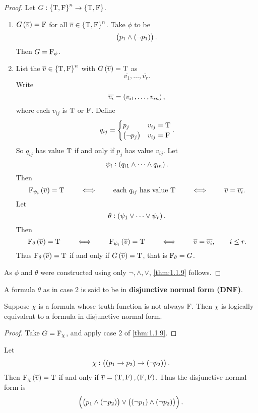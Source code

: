 \begin{proof}
Let $ G : \cbr{\T, \F}^n \to \cbr{\T, \F} $.
\begin{enumerate}[leftmargin=0.5in, label=Case \arabic*.]
\item $ G\br{\overline{v}} = \F $ for all $ \overline{v} \in \cbr{\T, \F}^n $. Take $ \phi $ to be
$$ \andb{p_1}{\notb{p_1}}. $$
Then $ G = \mathrm{F}_\phi $.

\pagebreak

\item List the $ \overline{v} \in \cbr{\T, \F}^n $ with $ G\br{\overline{v}} = \T $ as
$$ \overline{v_1}, \dots, \overline{v_r}. $$
Write
$$ \overline{v_i} = \br{v_{i1}, \dots, v_{in}}, $$
where each $ v_{ij} $ is $ \mathrm{T} $ or $ \mathrm{F} $. Define
$$ q_{ij} =
\begin{cases}
p_j & v_{ij} = \T \\
\notb{p_j} & v_{ij} = \F
\end{cases}.
$$
So $ q_{ij} $ has value $ \mathrm{T} $ if and only if $ p_j $ has value $ v_{ij} $. Let
$$ \psi_i : \br{q_{i1} \land \dots \land q_{in}}. $$
Then
$$ \F_{\psi_i}\br{\overline{v}} = \T \qquad \iff \qquad \text{each} \ q_{ij} \ \text{has value} \ \T \qquad \iff \qquad \overline{v} = \overline{v_i}. $$
Let
$$ \theta : \br{\psi_1 \lor \dots \lor \psi_r}. $$
Then
$$ \F_\theta\br{\overline{v}} = \T \qquad \iff \qquad \F_{\psi_i}\br{\overline{v}} = \T \qquad \iff \qquad \overline{v} = \overline{v_i}, \qquad i \le r. $$
Thus $ \F_\theta\br{\overline{v}} = \T $ if and only if $ G\br{\overline{v}} = \T $, that is $ \mathrm{F}_\theta = G $.
\end{enumerate}
As $ \phi $ and $ \theta $ were constructed using only $ \neg, \land, \lor $, \ref{thm:1.1.9} follows.
\end{proof}

A formula $ \theta $ as in case $ 2 $ is said to be in \textbf{disjunctive normal form (DNF)}.

\begin{corollary}
Suppose $ \chi $ is a formula whose truth function is not always $ \mathrm{F} $. Then $ \chi $ is logically equivalent to a formula in disjunctive normal form.
\end{corollary}

\begin{proof}
Take $ G = \mathrm{F}_\chi $, and apply case $ 2 $ of \ref{thm:1.1.9}.
\end{proof}

\begin{example*}
Let
$$ \chi : \impb{\impb{p_1}{p_2}}{\notb{p_2}}. $$
Then $ \F_\chi\br{\overline{v}} = \T $ if and only if $ \overline{v} = \br{\T, \F}, \br{\F, \F} $. Thus the disjunctive normal form is
$$ \orb{\andb{p_1}{\notb{p_2}}}{\andb{\notb{p_1}}{\notb{p_2}}}. $$
\end{example*}

